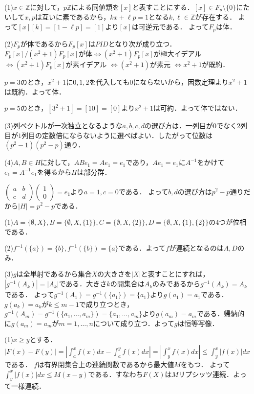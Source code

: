 \documentclass[
		book,
		head_space=20mm,
		foot_space=20mm,
		gutter=10mm,
		line_length=190mm
]{jlreq}
\begin{document}
	(1)$x \in \mathbb{Z}$に対して，$p \mathbb{Z}$による同値類を$[x]$と表すことにする．$[x]\in F_p\setminus\{0\}$にたいして$x,p$は互いに素であるから，$kx+\ell p=1$となる$k,\ell \in \mathbb{Z}$が存在する．
	よって$[x][k]=[1-\ell p]=[1]$より$[x]$は可逆元である．
	よって$F_p$は体．

	(2)$F_p$が体であるから$F_p[x]$は$PID$となり次が成り立つ．
	$F_p[x]/(x^2+1)F_p[x]$が体$\Leftrightarrow (x^2+1)F_p[x]$が極大イデアル $\Leftrightarrow (x^2+1)F_p[x]$が素イデアル $\Leftrightarrow (x^2+1)$が素元 $\Leftrightarrow x^2+1$が既約．

	$p=3$のとき，$x^2+1$に$0,1,2$を代入しても$0$にならないから，因数定理より$x^2+1$は既約．よって体．

	$p=5$のとき，$[3^2+1]=[10]=[0]$より$x^2+1$は可約．よって体ではない．
	
	(3)列ベクトルが一次独立となるような$a,b,c,d$の選び方は．一列目が$0$でなく$2$列目が$1$列目の定数倍にならないように選べばよい．したがって位数は$(p^2-1)(p^2-p)$通り．

(4)$A ,B \in H$に対して，$ABe_1=Ae_1=e_1$であり，$Ae_1=e_1$に$A^{-1}$をかけて$e_1=A^{-1}e_1$を得るから$H$は部分群．

$\begin{pmatrix}
	a & b \\
	c & d
\end{pmatrix}\begin{pmatrix}
	1 \\
	0
\end{pmatrix}=e_1$より$a=1,c=0$である．
よって$b,d$の選び方は$p^2-p$通りだから$|H|=p^2-p$である．

(1)$A=\{ \emptyset, X\},B=\{ \emptyset, X ,\{1\}\},C=\{ \emptyset, X ,\{2\}\},D=\{ \emptyset, X ,\{1\},\{2\}\}$の$4$つが位相である．

(2)$f^{-1}(\{a\})=\{ b\}, f^{-1}(\{ b\})=\{ a\}$である．よって$f$が連続となるのは$A,D$のみ．

(3)$g$は全単射であるから集合$X$の大きさを$|X|$と表すことにすれば，$|g^{-1}(A_k)|=|A_k|$である．大きさ$k$の開集合は$A_k$のみであるから$g^{-1}(A_k)=A_k$である．
よって$g^{-1}(A_1)=g^{-1}(\{a_1\})=\{a_1\}$より$g(a_1)=a_1$である．$g(a_k)=a_k$が$k\le m-1$で成り立つとき，$g^{-1}(A_m)=g^{-1}(\{ a_1,\dots,a_m\})=\{ a_1,\dots,a_m\}$より$g(a_m)=a_m$である．帰納的に$g(a_m)=a_m$が$m=1,\dots,n$について成り立つ．よって$g$は恒等写像．

(1)$x\ge y$とする．$|F(x)-F(y)|=|\int_a^x f(x)dx-\int_a^y f(x)dx|=|\int_y^x f(x)dx|\le \int_y^x |f(x)|dx$である．
$f$は有界閉集合上の連続関数であるから最大値$M$をもつ．
よって$\int_y^x |f(x)|dx\le M(x-y)$である．すなわち$F(X)$は$M$リプシッツ連続．よって一様連続．
\end{document}
